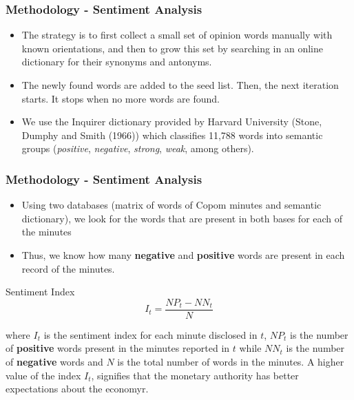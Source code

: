 \documentclass[aspectratio=169]{beamer}
\begin{document}
\begin{frame}\frametitle{Methodology - Sentiment Analysis}
\begin{itemize}
		\item The strategy is to first collect a small set of opinion words manually with known orientations, and then to grow this set by searching in an online dictionary for their synonyms and antonyms.
		\item The newly found words are added to the seed list. Then, the next iteration starts. It stops when no more words are found.
		\item We use the Inquirer dictionary provided by Harvard University (Stone, Dumphy and Smith (1966)) which classifies 11,788 words into semantic groups (\emph{positive}, \emph{negative}, \emph{strong}, \emph{weak}, among others).
\end{itemize}
\end{frame}

\begin{frame}\frametitle{Methodology - Sentiment Analysis}
  \begin{itemize}
    \item Using two databases (matrix of words of Copom minutes and semantic dictionary), we look for the words that are present in both bases for each of the minutes
    \item Thus, we know how many \textbf {negative} and \textbf {positive} words are present in each record of the minutes.
  \end{itemize}
  \begin{exampleblock}{Sentiment Index}
\[
{I}_{t} = \frac {{NP}_{t} - {NN}_{t}}{N} 
\]
  \end{exampleblock}
\noindent where ${I}_{t}$ is the sentiment index for each minute disclosed in $t$, ${NP}_{t}$ is the number of \textbf{positive} words present in the minutes reported in $t$ while ${NN}_{t}$ is the number of \textbf{negative} words and $N$ is the total number of words in the minutes. A higher value of the index ${I}_{t}$, signifies that the monetary authority has better expectations about the economyr.
\end{frame}
\end{document}
